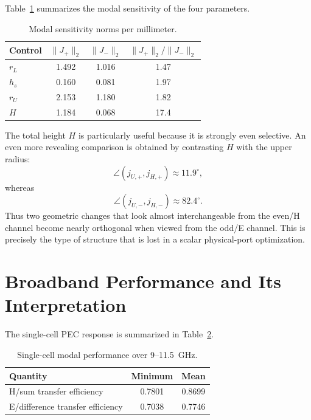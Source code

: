 \documentclass[journal]{IEEEtran}
\begin{document}


Table~\ref{tab:roles} summarizes the modal sensitivity of the four parameters.

\begin{table}[t]
\centering
\caption{Modal sensitivity norms per millimeter.}
\label{tab:roles}
\begin{tabular}{lccc}
\toprule
Control & $\|J_+\|_2$ & $\|J_-\|_2$ & $\|J_+\|_2/\|J_-\|_2$\\
\midrule
$r_L$ & 1.492 & 1.016 & 1.47\\
$h_s$ & 0.160 & 0.081 & 1.97\\
$r_U$ & 2.153 & 1.180 & 1.82\\
$H$   & 1.184 & 0.068 & 17.4\\
\bottomrule
\end{tabular}
\end{table}

The total height $H$ is particularly useful because it is strongly even selective.
An even more revealing comparison is obtained by contrasting $H$ with the upper radius:
\begin{equation}
\angle(j_{U,+},j_{H,+})\approx11.9^\circ,
\end{equation}
whereas
\begin{equation}
\boxed{\angle(j_{U,-},j_{H,-})\approx82.4^\circ}.
\end{equation}
Thus two geometric changes that look almost interchangeable from the even/H channel become nearly orthogonal when viewed from the odd/E channel.
This is precisely the type of structure that is lost in a scalar physical-port optimization.

\section{Broadband Performance and Its Interpretation}
The single-cell PEC response is summarized in Table~\ref{tab:perf}.

\begin{table}[t]
\centering
\caption{Single-cell modal performance over 9--11.5~GHz.}
\label{tab:perf}
\begin{tabular}{lcc}
\toprule
Quantity & Minimum & Mean\\
\midrule
H/sum transfer efficiency & 0.7801 & 0.8699\\
E/difference transfer efficiency & 0.7038 & 0.7746\\
\bottomrule
\end{tabular}
\end{table}
\end{document}
